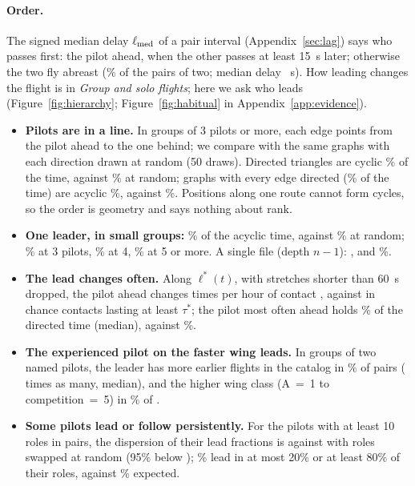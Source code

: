\paragraph{Order.} The signed median delay $\ell_{\rm med}$ of a pair interval
(Appendix~\ref{sec:lag}) says who passes first: the pilot ahead, when the other passes at least
15~s later; otherwise the two fly abreast (\Abreast\% of the pairs of two; median delay
\DelayMedian~s). How leading changes the flight is in \emph{Group and solo flights}; here we ask
who leads (Figure~\ref{fig:hierarchy}; Figure~\ref{fig:habitual} in Appendix~\ref{app:evidence}).
\begin{itemize}
  \item \textbf{Pilots are in a line.} In groups of 3 pilots or more, each edge points from
        the pilot ahead to the one behind; we compare with the same graphs with each direction drawn
        at random (50 draws). Directed triangles are cyclic \StCyclic\% \StCyclicBand{} of the time,
        against \StCyclicNull\% at random; graphs with every edge directed (\StFullShare\% of the time)
        are acyclic \StAcyclic\%, against \StAcyclicNull\%. Positions along one route cannot form
        cycles, so the order is geometry and says nothing about rank.
  \item \textbf{One leader, in small groups:} \StOneLeader\% \StOneLeaderBand{} of the acyclic time,
        against \StOneLeaderNull\% \StOneLeaderNullBand{} at random; \StOneLeaderThree\% at 3 pilots,
        \StOneLeaderFour\% at 4, \StOneLeaderFive\% at 5 or more. A single file (depth $n-1$):
        \StLineThree, \StLineFour{} and \StLineFive\%.
  \item \textbf{The lead changes often.} Along $\ell^*(t)$, with stretches shorter than 60~s dropped,
        the pilot ahead changes \StSwitches{} times per hour of contact \StSwitchesBand{}, against
        \StSwitchesChance{} \StSwitchesChanceBand{} in chance contacts lasting at least $\tau^*$; the
        pilot most often ahead holds \StDominant\% of the directed time (median), against
        \StDominantChance\%.
  \item \textbf{The experienced pilot on the faster wing leads.} In groups of two named
        pilots, the leader has more earlier flights in the catalog in \StExp\% \StExpBand{} of
        \StExpPairs{} pairs (\StExpRatio{} times as many, median), and the higher wing class (A~=~1 to
        competition~=~5) in \StWing\% \StWingBand{} of \StWingPairs.
  \item \textbf{Some pilots lead or follow persistently.} For the \HabitualPilots{} pilots with at
        least 10 roles in pairs, the dispersion of their lead fractions is \HabitualDispersion{}
        against \HabitualNull{} with roles swapped at random (95\% below \HabitualNullHigh);
        \HabitualExtreme\% lead in at most 20\% or at least 80\% of their roles, against
        \HabitualExtremeNull\% expected.
\end{itemize}

